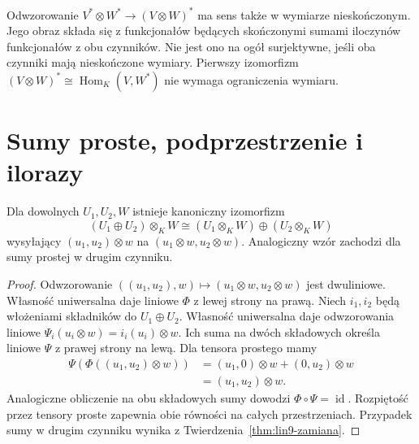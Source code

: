 \begin{uwaga}
\label{rem:lin9-dual-nieskonczony}
Odwzorowanie
\(V^*\otimes W^*\to(V\otimes W)^*\)
ma sens także w wymiarze
nieskończonym. Jego obraz
składa się z funkcjonałów
będących skończonymi sumami
iloczynów funkcjonałów
z obu czynników.
Nie jest ono na ogół surjektywne,
jeśli oba czynniki mają
nieskończone wymiary.
Pierwszy izomorfizm
\((V\otimes W)^*
\cong\operatorname{Hom}_K(V,W^*)\)
nie wymaga ograniczenia wymiaru.
\end{uwaga}

\section{Sumy proste, podprzestrzenie i ilorazy}
\label{sec:lin9-ilorazy}

\begin{twierdzenie}
\label{thm:lin9-suma-prosta}
Dla dowolnych \(U_1,U_2,W\)
istnieje kanoniczny izomorfizm
\[
 (U_1\oplus U_2)\otimes_KW
 \cong (U_1\otimes_KW)\oplus(U_2\otimes_KW)
\]
wysyłający
\((u_1,u_2)\otimes w\)
na
\((u_1\otimes w,u_2\otimes w)\).
Analogiczny wzór zachodzi
dla sumy prostej w drugim czynniku.
\end{twierdzenie}
\begin{proof}
Odwzorowanie
\(((u_1,u_2),w)\mapsto
(u_1\otimes w,u_2\otimes w)\)
jest dwuliniowe.
Własność uniwersalna
daje liniowe \(\Phi\)
z lewej strony na prawą.
Niech \(i_1,i_2\)
będą włożeniami składników
do \(U_1\oplus U_2\).
Własność uniwersalna daje
odwzorowania liniowe
\(\Psi_i(u_i\otimes w)=i_i(u_i)\otimes w\).
Ich suma na dwóch składowych
określa liniowe \(\Psi\)
z prawej strony na lewą.
Dla tensora prostego mamy
\[
 \begin{aligned}
 \Psi(\Phi((u_1,u_2)\otimes w))
 &=(u_1,0)\otimes w+(0,u_2)\otimes w\\
 &=(u_1,u_2)\otimes w.
 \end{aligned}
\]
Analogiczne obliczenie
na obu składowych sumy
dowodzi \(\Phi\circ\Psi=\operatorname{id}\).
Rozpiętość przez tensory proste
zapewnia obie równości na
całych przestrzeniach.
Przypadek sumy w drugim
czynniku wynika z
Twierdzenia~\ref{thm:lin9-zamiana}.
\end{proof}

